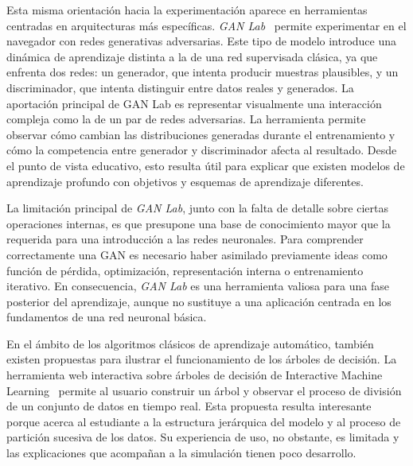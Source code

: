 
Esta misma orientación hacia la experimentación aparece en herramientas centradas en arquitecturas más específicas.
\textit{GAN Lab}~\cite{GANLab} permite experimentar en el navegador con redes generativas adversarias.
Este tipo de modelo introduce una dinámica de aprendizaje distinta a la de una red supervisada clásica, ya que enfrenta dos redes: un generador, que intenta producir muestras plausibles, y un discriminador, que intenta distinguir entre datos reales y generados.
La aportación principal de GAN Lab es representar visualmente una interacción compleja como la de un par de redes adversarias.
La herramienta permite observar cómo cambian las distribuciones generadas durante el entrenamiento y cómo la competencia entre generador y discriminador afecta al resultado.
Desde el punto de vista educativo, esto resulta útil para explicar que existen modelos de aprendizaje profundo con objetivos y esquemas de aprendizaje diferentes.

La limitación principal de \textit{GAN Lab}, junto con la falta de detalle sobre ciertas operaciones internas, es que presupone una base de conocimiento mayor que la requerida para una introducción a las redes neuronales.
Para comprender correctamente una GAN es necesario haber asimilado previamente ideas como función de pérdida, optimización, representación interna o entrenamiento iterativo.
En consecuencia, \textit{GAN Lab} es una herramienta valiosa para una fase posterior del aprendizaje, aunque no sustituye a una aplicación centrada en los fundamentos de una red neuronal básica.


En el ámbito de los algoritmos clásicos de aprendizaje automático, también existen propuestas para ilustrar el funcionamiento de los árboles de decisión.
La herramienta web interactiva sobre árboles de decisión de Interactive Machine Learning~\cite{InteractiveDecisionTrees} permite al usuario construir un árbol y observar el proceso de división de un conjunto de datos en tiempo real.
Esta propuesta resulta interesante porque acerca al estudiante a la estructura jerárquica del modelo y al proceso de partición sucesiva de los datos.
Su experiencia de uso, no obstante, es limitada y las explicaciones que acompañan a la simulación tienen poco desarrollo.

